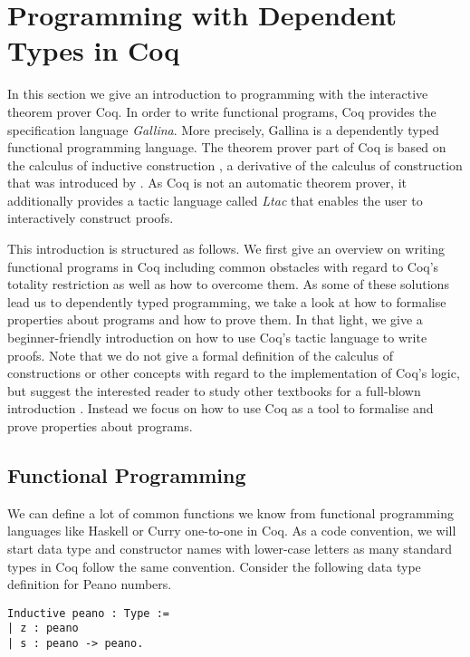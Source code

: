 \section{Programming with Dependent Types in Coq}
\label{sec:progDT}

In this section we give an introduction to programming with the interactive theorem prover Coq.
In order to write functional programs, Coq provides the specification language \emph{Gallina}.
More precisely, Gallina is a dependently typed functional programming language.
The theorem prover part of Coq is based on the calculus of inductive construction \citep{coquand1988inductively}, a derivative of the calculus of construction that was introduced by \citet{coquand1986calculus}.
As Coq is not an automatic theorem prover, it additionally provides a tactic language called \emph{Ltac} that enables the user to interactively construct proofs.

This introduction is structured as follows.
We first give an overview on writing functional programs in Coq including common obstacles with regard to Coq's totality restriction as well as how to overcome them.
As some of these solutions lead us to dependently typed programming, we take a look at how to formalise properties about programs and how to prove them.
In that light, we give a beginner-friendly introduction on how to use Coq's tactic language to write proofs.
Note that we do not give a formal definition of the calculus of constructions or other concepts with regard to the implementation of Coq's logic, but suggest the interested reader to study other textbooks for a full-blown introduction \citep{pierce2010software, chlipala2011certified}.
Instead we focus on how to use Coq as a tool to formalise and prove properties about programs.

\subsection{Functional Programming}

We can define a lot of common functions we know from functional programming languages like Haskell or Curry one-to-one in Coq.
As a code convention, we will start data type and constructor names with lower-case letters as many standard types in Coq follow the same convention.
Consider the following data type definition for Peano numbers.

\begin{verbatim}
Inductive peano : Type :=
| z : peano
| s : peano -> peano.
\end{verbatim}

